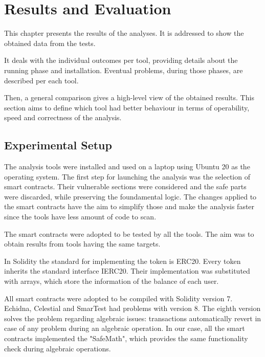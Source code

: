 
\chapter{Results and Evaluation}
\label{ch:Evaluation}
This chapter presents the results of the analyses. It is addressed to show the obtained data from the tests.

It deals with the individual outcomes per tool, providing details about the running phase and installation.
Eventual problems, during those phases, are described per each tool.

Then, a general comparison gives a high-level view of the obtained results.
This section aims to define which tool had better behaviour in terms of operability, speed and correctness of the analysis. 


\section {Experimental Setup}
The analysis tools were installed and used on a laptop using Ubuntu 20 as the operating system.
The first step for launching the analysis was the selection of smart contracts. 
Their vulnerable sections were considered and the safe parts were discarded, while preserving the foundamental logic. 
The changes applied to the smart contracts have the aim to simplify those and make the analysis faster since the tools have less amount of code to scan. 

The smart contracts were adopted to be tested by all the tools. 
The aim was to obtain results from tools having the same targets.

In Solidity the standard for implementing the token is ERC20. 
Every token inherits the standard interface IERC20.
Their implementation was substituted with arrays, which store the information of the balance of each user.

All smart contracts were adopted to be compiled with Solidity version 7.
Echidna, Celestial and SmarTest had problems with version 8. 
The eighth version solves the problem regarding algebraic issues: 
transactions automatically revert in case of any problem during an algebraic operation. 
In our case, all the smart contracts implemented the "SafeMath", which provides the same functionality check during algebraic operations.

